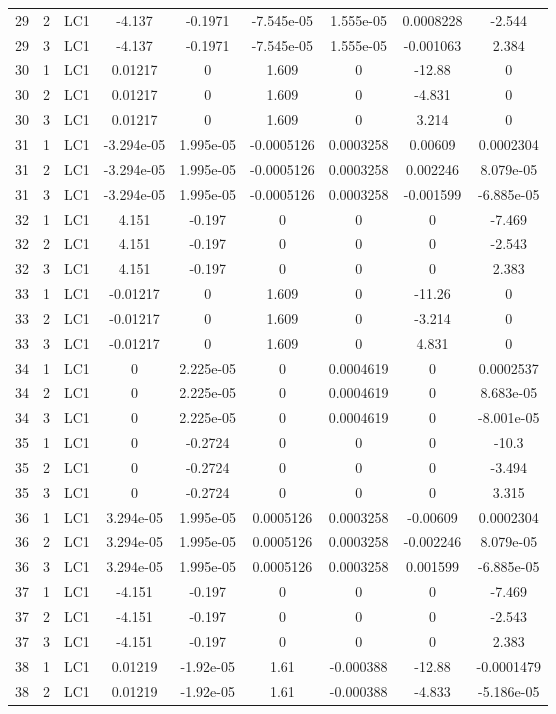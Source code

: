 \documentclass{article}%
\begin{document}
\begin{longtable}{| c c c | c c c c c c |}
29&2&LC1&{-}4.137&{-}0.1971&{-}7.545e{-}05&1.555e{-}05&0.0008228&{-}2.544\\%
29&3&LC1&{-}4.137&{-}0.1971&{-}7.545e{-}05&1.555e{-}05&{-}0.001063&2.384\\%
30&1&LC1&0.01217&0&1.609&0&{-}12.88&0\\%
30&2&LC1&0.01217&0&1.609&0&{-}4.831&0\\%
30&3&LC1&0.01217&0&1.609&0&3.214&0\\%
31&1&LC1&{-}3.294e{-}05&1.995e{-}05&{-}0.0005126&0.0003258&0.00609&0.0002304\\%
31&2&LC1&{-}3.294e{-}05&1.995e{-}05&{-}0.0005126&0.0003258&0.002246&8.079e{-}05\\%
31&3&LC1&{-}3.294e{-}05&1.995e{-}05&{-}0.0005126&0.0003258&{-}0.001599&{-}6.885e{-}05\\%
32&1&LC1&4.151&{-}0.197&0&0&0&{-}7.469\\%
32&2&LC1&4.151&{-}0.197&0&0&0&{-}2.543\\%
32&3&LC1&4.151&{-}0.197&0&0&0&2.383\\%
33&1&LC1&{-}0.01217&0&1.609&0&{-}11.26&0\\%
33&2&LC1&{-}0.01217&0&1.609&0&{-}3.214&0\\%
33&3&LC1&{-}0.01217&0&1.609&0&4.831&0\\%
34&1&LC1&0&2.225e{-}05&0&0.0004619&0&0.0002537\\%
34&2&LC1&0&2.225e{-}05&0&0.0004619&0&8.683e{-}05\\%
34&3&LC1&0&2.225e{-}05&0&0.0004619&0&{-}8.001e{-}05\\%
35&1&LC1&0&{-}0.2724&0&0&0&{-}10.3\\%
35&2&LC1&0&{-}0.2724&0&0&0&{-}3.494\\%
35&3&LC1&0&{-}0.2724&0&0&0&3.315\\%
36&1&LC1&3.294e{-}05&1.995e{-}05&0.0005126&0.0003258&{-}0.00609&0.0002304\\%
36&2&LC1&3.294e{-}05&1.995e{-}05&0.0005126&0.0003258&{-}0.002246&8.079e{-}05\\%
36&3&LC1&3.294e{-}05&1.995e{-}05&0.0005126&0.0003258&0.001599&{-}6.885e{-}05\\%
37&1&LC1&{-}4.151&{-}0.197&0&0&0&{-}7.469\\%
37&2&LC1&{-}4.151&{-}0.197&0&0&0&{-}2.543\\%
37&3&LC1&{-}4.151&{-}0.197&0&0&0&2.383\\%
38&1&LC1&0.01219&{-}1.92e{-}05&1.61&{-}0.000388&{-}12.88&{-}0.0001479\\%
38&2&LC1&0.01219&{-}1.92e{-}05&1.61&{-}0.000388&{-}4.833&{-}5.186e{-}05\\%

\end{longtable}
\end{document}
